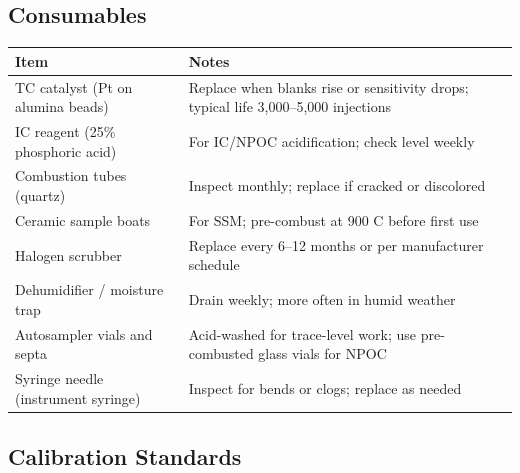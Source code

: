 \documentclass[
  11pt,
  letterpaper,
]{article}
\newcounter{none} %
\begin{document}
\subsection{Consumables}\label{consumables}

{\def\LTcaptype{none} %
\begin{longtable}[]{@{}
  >{\raggedright\arraybackslash}p{}
  >{\raggedright\arraybackslash}p{}@{}}
\toprule\noalign{}
\begin{minipage}[b]{\linewidth}\raggedright
Item
\end{minipage} & \begin{minipage}[b]{\linewidth}\raggedright
Notes
\end{minipage} \\
\midrule\noalign{}
\endhead
\bottomrule\noalign{}
\endlastfoot
TC catalyst (Pt on alumina beads) & Replace when blanks rise or
sensitivity drops; typical life 3,000--5,000 injections \\
IC reagent (25\% phosphoric acid) & For IC/NPOC acidification; check
level weekly \\
Combustion tubes (quartz) & Inspect monthly; replace if cracked or
discolored \\
Ceramic sample boats & For SSM; pre-combust at 900 C before first use \\
Halogen scrubber & Replace every 6--12 months or per manufacturer
schedule \\
Dehumidifier / moisture trap & Drain weekly; more often in humid
weather \\
Autosampler vials and septa & Acid-washed for trace-level work; use
pre-combusted glass vials for NPOC \\
Syringe needle (instrument syringe) & Inspect for bends or clogs;
replace as needed \\
\end{longtable}
}

\subsection{Calibration Standards}\label{calibration-standards}
\end{document}
